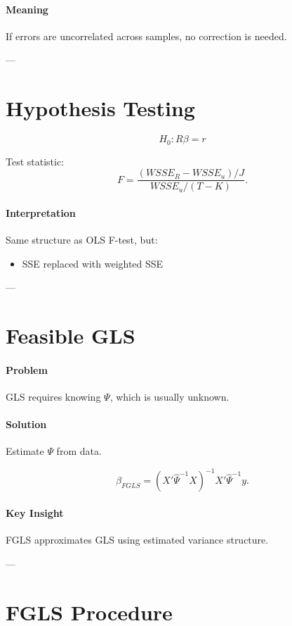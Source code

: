 \paragraph{Meaning}
If errors are uncorrelated across samples, no correction is needed.

---

\section{Hypothesis Testing}

\[
H_0: R\beta = r
\]

Test statistic:
\[
F
=
\frac{(WSSE_R-WSSE_u)/J}{WSSE_u/(T-K)}.
\]

\paragraph{Interpretation}
Same structure as OLS F-test, but:
\begin{itemize}
    \item SSE replaced with weighted SSE
\end{itemize}

---

\section{Feasible GLS}

\paragraph{Problem}
GLS requires knowing $\Psi$, which is usually unknown.

\paragraph{Solution}
Estimate $\Psi$ from data.

\[
\hat{\beta}_{FGLS}
=
(X'\hat{\Psi}^{-1}X)^{-1}X'\hat{\Psi}^{-1}y.
\]

\paragraph{Key Insight}
FGLS approximates GLS using estimated variance structure.

---

\section{FGLS Procedure}

